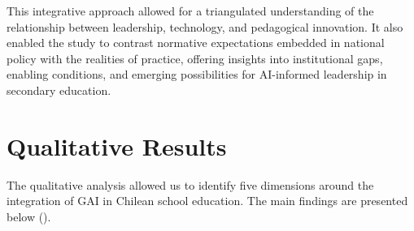 \documentclass[english]{textolivre}
\begin{document}
This integrative approach allowed for a triangulated understanding of the relationship between leadership, technology, and pedagogical innovation. It also enabled the study to contrast normative expectations embedded in national policy with the realities of practice, offering insights into institutional gaps, enabling conditions, and emerging possibilities for AI-informed leadership in secondary education.

\section{Qualitative Results}\label{sec-formato}
The qualitative analysis allowed us to identify five dimensions around the integration of GAI in Chilean school education. The main findings are presented below ().
\end{document}

